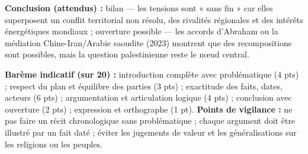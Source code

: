 \documentclass[11pt]{article}
\begin{document}
\begin{corrige}
\textbf{Conclusion (attendus) :} bilan — les tensions sont « sans fin » car elles superposent un conflit territorial non résolu, des rivalités régionales et des intérêts énergétiques mondiaux ; ouverture possible — les accords d'Abraham ou la médiation Chine-Iran/Arabie saoudite (2023) montrent que des recompositions sont possibles, mais la question palestinienne reste le nœud central.

\textbf{Barème indicatif (sur 20) :} introduction complète avec problématique (4 pts) ; respect du plan et équilibre des parties (3 pts) ; exactitude des faits, dates, acteurs (6 pts) ; argumentation et articulation logique (4 pts) ; conclusion avec ouverture (2 pts) ; expression et orthographe (1 pt).
\textbf{Points de vigilance :} ne pas faire un récit chronologique sans problématique ; chaque argument doit être illustré par un fait daté ; éviter les jugements de valeur et les généralisations sur les religions ou les peuples.
\end{corrige}
\end{document}
